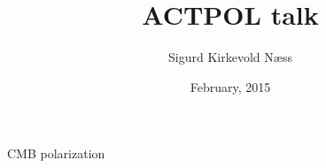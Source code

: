 \documentclass[table]{beamer}
\title{ACTPOL talk}
\author{Sigurd Kirkevold Næss}
\institute{Subdepartment of astrophysics, Oxford University}
\date{February, 2015}
\begin{document}
\begin{frame}{CMB polarization}
\end{frame}
\end{document}
